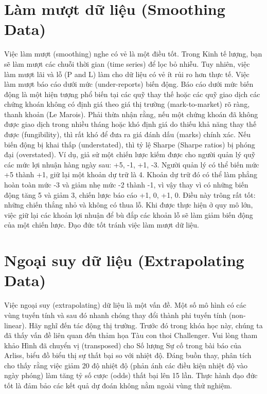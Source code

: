 \section{Làm mượt dữ liệu (Smoothing Data)}

Việc làm mượt (smoothing) nghe có vẻ là một điều tốt. Trong Kinh tế lượng, bạn sẽ làm mượt các chuỗi thời gian (time series) để lọc bỏ nhiễu. Tuy nhiên, việc làm mượt lãi và lỗ (P and L) làm cho dữ liệu có vẻ ít rủi ro hơn thực tế. Việc làm mượt báo cáo dưới mức (under-reports) biến động. Báo cáo dưới mức biến động là một hiện tượng phổ biến tại các quỹ thay thế hoặc các quỹ giao dịch các chứng khoán không có định giá theo giá thị trường (mark-to-market) rõ ràng, thanh khoản (Le Marois). Phải thừa nhận rằng, nếu một chứng khoán đã không được giao dịch trong nhiều tháng hoặc khó định giá do thiếu khả năng thay thế được (fungibility), thì rất khó để đưa ra giá đánh dấu (marks) chính xác. Nếu biến động bị khai thấp (understated), thì tỷ lệ Sharpe (Sharpe ratios) bị phóng đại (overstated). Ví dụ, giả sử một chiến lược kiếm được cho người quản lý quỹ các mức lợi nhuận hàng ngày sau: +5, -1, +1, -3. Người quản lý có thể biến mức +5 thành +1, giữ lại một khoản dự trữ là 4. Khoản dự trữ đó có thể làm phẳng hoàn toàn mức -3 và giảm nhẹ mức -2 thành -1, vì vậy thay vì có những biến động tăng 5 và giảm 3, chiến lược báo cáo +1, 0, +1, 0. Điều này trông rất tốt: những chiến thắng nhỏ và không có thua lỗ. Khi được thực hiện ở quy mô lớn, việc giữ lại các khoản lợi nhuận để bù đắp các khoản lỗ sẽ làm giảm biến động của một chiến lược. Đạo đức tốt tránh việc làm mượt dữ liệu.

\section{Ngoại suy dữ liệu (Extrapolating Data)}

Việc ngoại suy (extrapolating) dữ liệu là một vấn đề. Một số mô hình có các vùng tuyến tính và sau đó nhanh chóng thay đổi thành phi tuyến tính (non-linear). Hãy nghĩ đến tác động thị trường. Trước đó trong khóa học này, chúng ta đã thấy vấn đề liên quan đến thảm họa Tàu con thoi Challenger. Vui lòng tham khảo Hình đã chuyển vị (transposed) cho Số lượng Sự cố trong bài báo của Arliss, biểu đồ biểu thị sự thất bại so với nhiệt độ. Đáng buồn thay, phân tích cho thấy rằng việc giảm 20 độ nhiệt độ (phản ánh các điều kiện nhiệt độ vào ngày phóng) làm tăng tỷ số cược (odds) thất bại lên 15 lần. Thực hành đạo đức tốt là đảm bảo các kết quả dự đoán không nằm ngoài vùng thử nghiệm.

